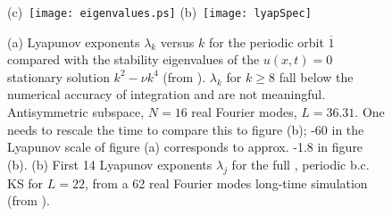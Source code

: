 \begin{figure}
 (c)~\texttt{[image: eigenvalues.ps]}
 (b)~\texttt{[image: lyapSpec]}
\caption{
(a)
Lyapunov exponents $\lambda_k$ versus $k$ for the periodic
orbit $\overline{1}$ compared with  the stability eigenvalues
of the $u(x,t)=0$ stationary solution $k^2- \nu k^4$ (from
). $\lambda_k$ for $k \geq 8$ fall
below the numerical accuracy of integration and are not
meaningful. Antisymmetric subspace, $N=16$ real Fourier
modes, $L=36.31$. One needs to rescale the time to compare
this to figure (b); -60 in the Lyapunov scale of figure (a)
corresponds to approx. -1.8 in figure (b).
(b)
First 14 Lyapunov exponents $\lambda_j$ for the full
\statesp, periodic b.c. KS for $L=22$, from a 62 real Fourier
modes long-time simulation (from ).
}
\label{fig:lyapSpec}
\end{figure}


